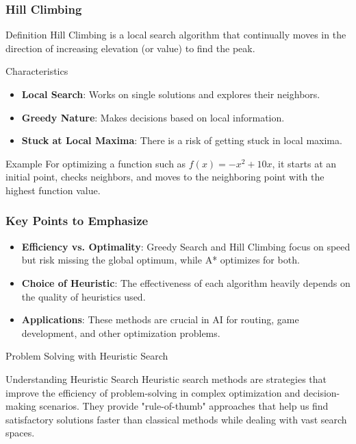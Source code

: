 \documentclass[aspectratio=169]{beamer}
\begin{document}
\begin{frame}[fragile]
    \frametitle{Hill Climbing}
    \begin{block}{Definition}
        Hill Climbing is a local search algorithm that continually moves in the direction of increasing elevation (or value) to find the peak.
    \end{block}
    \begin{block}{Characteristics}
        \begin{itemize}
            \item \textbf{Local Search}: Works on single solutions and explores their neighbors.
            \item \textbf{Greedy Nature}: Makes decisions based on local information.
            \item \textbf{Stuck at Local Maxima}: There is a risk of getting stuck in local maxima.
        \end{itemize}
    \end{block}
    \begin{block}{Example}
        For optimizing a function such as \( f(x) = -x^{2} + 10x \), it starts at an initial point, checks neighbors, and moves to the neighboring point with the highest function value.
    \end{block}
\end{frame}

\begin{frame}[fragile]
    \frametitle{Key Points to Emphasize}
    \begin{itemize}
        \item \textbf{Efficiency vs. Optimality}: Greedy Search and Hill Climbing focus on speed but risk missing the global optimum, while A* optimizes for both.
        \item \textbf{Choice of Heuristic}: The effectiveness of each algorithm heavily depends on the quality of heuristics used.
        \item \textbf{Applications}: These methods are crucial in AI for routing, game development, and other optimization problems.
    \end{itemize}
\end{frame}

\begin{frame}[fragile]{Problem Solving with Heuristic Search}
    \begin{block}{Understanding Heuristic Search}
        Heuristic search methods are strategies that improve the efficiency of problem-solving in complex optimization and decision-making scenarios. They provide "rule-of-thumb" approaches that help us find satisfactory solutions faster than classical methods while dealing with vast search spaces.
    \end{block}
\end{frame}
\end{document}
